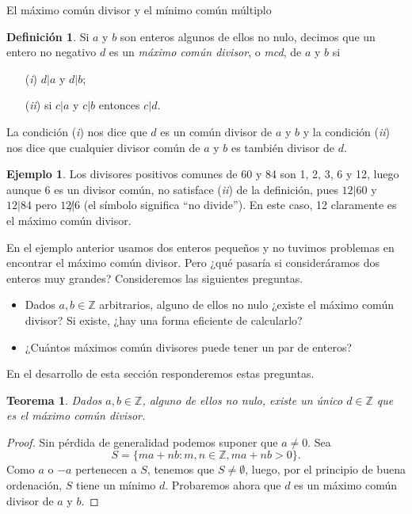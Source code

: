 \documentclass[11pt,spanish,makeidx]{amsbook}
\newtheorem{teorema}{Teorema}[section]
\theoremstyle{definition}
\newtheorem{definicion}{Definici\'on}[section]
\newtheorem{ejemplo}{Ejemplo}[section]
\theoremstyle{remark}
\newcommand \ZZ{{\mathbb Z}}
\begin{document}
\begin{section}{El máximo común divisor y el mínimo común múltiplo}\label{1.7}

\begin{definicion}\label{mcd} Si $a$ y $b$ son enteros algunos de ellos no nulo, decimos que un entero no negativo $d$ es un {\em máximo común divisor}, o {\em mcd}, de $a$ y $b$ si
\begin{enumerate}
\item[({\em i})] $ d|a$ y $d|b$;
\item[({\em ii})] si $ c|a $ y $c|b$ entonces $ c|d$.
\end{enumerate}
\end{definicion}

La condición ({\em i}) nos dice que $d$ es un común divisor de $a$ y $b$ y la condición ({\em ii}) nos dice que cualquier divisor común de $a$ y $b$ es también divisor de $d$. 


\begin{ejemplo} \label{ejem-1-mcd}
	Los divisores positivos comunes de 60  y 84 son 1, 2, 3, 6 y 12, luego aunque 6  es un divisor común, no satisface ({\em ii}) de la definición, pues $12|60$ y $12|84$ pero $12{\not|}6$ (el símbolo significa ``no divide''). En este caso, 12  claramente es  el  máximo común divisor.
\end{ejemplo}

En el ejemplo anterior usamos dos enteros pequeños y no tuvimos problemas en encontrar el  máximo común divisor. Pero ¿qué pasaría si consideráramos dos enteros muy grandes? Consideremos las siguientes preguntas.
\begin{itemize}
	\item Dados $a,b \in \ZZ$ arbitrarios, alguno de ellos no nulo ¿existe el máximo común divisor? Si existe, ¿hay una forma eficiente de calcularlo?
	\item  ¿Cuántos máximos común divisores puede tener un  par de enteros?
\end{itemize}
En  el desarrollo de esta sección responderemos estas preguntas. 


\begin{teorema}
	Dados $a,b \in \ZZ$, alguno de ellos no nulo, existe un único $d \in \ZZ$ que es el máximo común divisor. 
\end{teorema}
\begin{proof}
	Sin pérdida de generalidad podemos suponer que  $a \ne 0$. Sea 
	\begin{equation*}
		S = \{m a+n b : m,n\in \ZZ, m a+n b>0\}.
	\end{equation*}
	Como  $a$ o $-a$ pertenecen a $S$, tenemos que  $S \not= \emptyset$, luego, por el principio de buena ordenación, $S$ tiene un  mínimo $d$. Probaremos ahora que  $d$  es un  máximo común divisor de $a$ y $b$. 
	

\end{proof}
\end{section}
\end{document}
